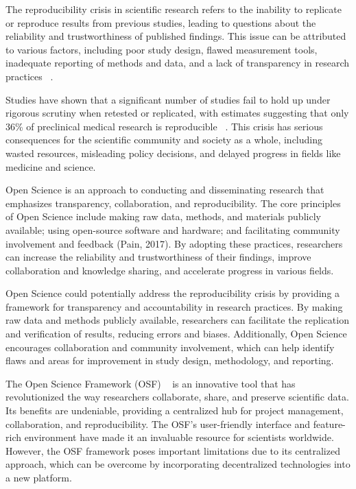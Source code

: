 

The reproducibility crisis in scientific research refers to the inability to replicate or reproduce results from previous studies, leading to questions about the reliability and trustworthiness of published findings. This issue can be attributed to various factors, including poor study design, flawed measurement tools, inadequate reporting of methods and data, and a lack of transparency in research practices ~\cite{freedman_economics_2015}.

Studies have shown that a significant number of studies fail to hold up under rigorous scrutiny when retested or replicated, with estimates suggesting that only 36\% of preclinical medical research is reproducible ~\cite{begley_reproducibility_2015}. This crisis has serious consequences for the scientific community and society as a whole, including wasted resources, misleading policy decisions, and delayed progress in fields like medicine and science.

Open Science is an approach to conducting and disseminating research that emphasizes transparency, collaboration, and reproducibility. The core principles of Open Science include making raw data, methods, and materials publicly available; using open-source software and hardware; and facilitating community involvement and feedback (Pain, 2017). By adopting these practices, researchers can increase the reliability and trustworthiness of their findings, improve collaboration and knowledge sharing, and accelerate progress in various fields.

Open Science could potentially address the reproducibility crisis by providing a framework for transparency and accountability in research practices. By making raw data and methods publicly available, researchers can facilitate the replication and verification of results, reducing errors and biases. Additionally, Open Science encourages collaboration and community involvement, which can help identify flaws and areas for improvement in study design, methodology, and reporting.

The Open Science Framework (OSF) ~\cite{foster_open_2017} is an innovative tool that has revolutionized the way researchers collaborate, share, and preserve scientific data. Its benefits are undeniable, providing a centralized hub for project management, collaboration, and reproducibility. The OSF's user-friendly interface and feature-rich environment have made it an invaluable resource for scientists worldwide. However, the OSF framework poses important limitations due to its centralized approach, which can be overcome by incorporating decentralized technologies into a new platform.

